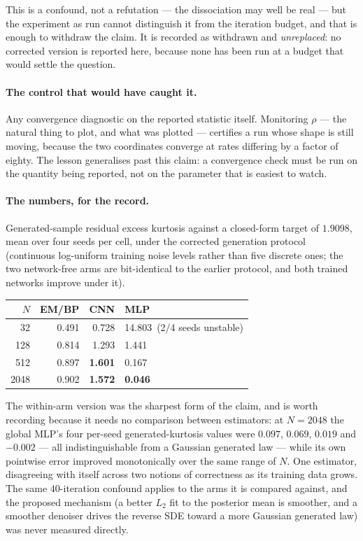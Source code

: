 This is a confound, not a refutation --- the dissociation may well be real ---
but the experiment as run cannot distinguish it from the iteration budget, and
that is enough to withdraw the claim. It is recorded as withdrawn and
\emph{unreplaced}: no corrected version is reported here, because none has
been run at a budget that would settle the question.

\paragraph{The control that would have caught it.} Any convergence diagnostic
on the reported statistic itself. Monitoring $\rho$ --- the natural thing to
plot, and what was plotted --- certifies a run whose shape is still moving,
because the two coordinates converge at rates differing by a factor of eighty.
The lesson generalises past this claim: a convergence check must be run on the
quantity being reported, not on the parameter that is easiest to watch.

\paragraph{The numbers, for the record.} Generated-sample residual excess
kurtosis against a closed-form target of $1.9098$, mean over four seeds per
cell, under the corrected generation protocol (continuous log-uniform training
noise levels rather than five discrete ones; the two network-free arms are
bit-identical to the earlier protocol, and both trained networks improve under
it).

\begin{center}
\begin{tabular}{@{}rrrl@{}}
\toprule
$N$ & EM/BP & CNN & MLP \\
\midrule
32   & 0.491 & 0.728 & 14.803\ (2/4 seeds unstable) \\
128  & 0.814 & 1.293 & 1.441 \\
512  & 0.897 & \textbf{1.601} & 0.167 \\
2048 & 0.902 & \textbf{1.572} & \textbf{0.046} \\
\bottomrule
\end{tabular}
\end{center}

\noindent
The within-arm version was the sharpest form of the claim, and is worth
recording because it needs no comparison between estimators: at $N=2048$ the
global MLP's four per-seed generated-kurtosis values were $0.097$, $0.069$,
$0.019$ and $-0.002$ --- all indistinguishable from a Gaussian generated law
--- while its own pointwise error improved monotonically over the same range
of $N$. One estimator, disagreeing with itself across two notions of
correctness as its training data grows. The same $40$-iteration confound
applies to the arms it is compared against, and the proposed mechanism (a
better $L_2$ fit to the posterior mean is smoother, and a smoother denoiser
drives the reverse SDE toward a more Gaussian generated law) was never
measured directly.
